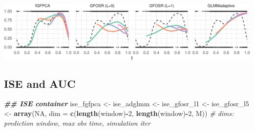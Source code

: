 \documentclass[
]{article}
\newenvironment{Shaded}{\begin{snugshade}}{\end{snugshade}}
\newcommand{\AttributeTok}[1]{\textcolor[rgb]{0.13,0.29,0.53}{#1}}
\newcommand{\CommentTok}[1]{\textcolor[rgb]{0.56,0.35,0.01}{\textit{#1}}}
\newcommand{\ConstantTok}[1]{\textcolor[rgb]{0.56,0.35,0.01}{#1}}
\newcommand{\DecValTok}[1]{\textcolor[rgb]{0.00,0.00,0.81}{#1}}
\newcommand{\DocumentationTok}[1]{\textcolor[rgb]{0.56,0.35,0.01}{\textbf{\textit{#1}}}}
\newcommand{\FunctionTok}[1]{\textcolor[rgb]{0.13,0.29,0.53}{\textbf{#1}}}
\newcommand{\NormalTok}[1]{#1}
\newcommand{\OtherTok}[1]{\textcolor[rgb]{0.56,0.35,0.01}{#1}}
\newcommand{\SpecialCharTok}[1]{\textcolor[rgb]{0.81,0.36,0.00}{\textbf{#1}}}
\begin{document}
\includegraphics{manuscript_files/figure-latex/fig_large_sim_pre-1.pdf}

\subsection{ISE and AUC}\label{ise-and-auc}

\begin{Shaded}
\begin{Highlighting}[]
\DocumentationTok{\#\# ISE container }
\NormalTok{ise\_fgfpca }\OtherTok{\textless{}{-}}\NormalTok{ ise\_adglmm }\OtherTok{\textless{}{-}}\NormalTok{ ise\_gfosr\_l1 }\OtherTok{\textless{}{-}}\NormalTok{ ise\_gfosr\_l5 }\OtherTok{\textless{}{-}} 
  \FunctionTok{array}\NormalTok{(}\ConstantTok{NA}\NormalTok{, }\AttributeTok{dim =} \FunctionTok{c}\NormalTok{(}\FunctionTok{length}\NormalTok{(window)}\SpecialCharTok{{-}}\DecValTok{2}\NormalTok{, }\FunctionTok{length}\NormalTok{(window)}\SpecialCharTok{{-}}\DecValTok{2}\NormalTok{, M))}
\CommentTok{\# dims: prediction window, max obs time, simulation iter}
\end{Highlighting}
\end{Shaded}
\end{document}
